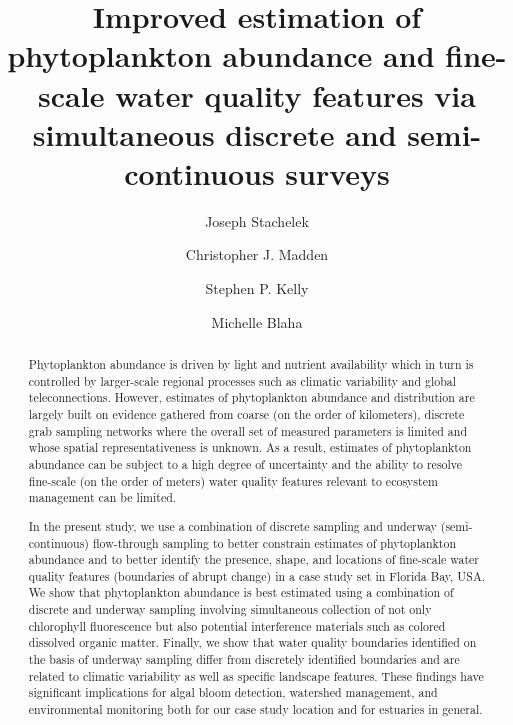 \documentclass[review]{elsarticle}
\begin{document}
  
  \begin{frontmatter}
  
  \title{Improved estimation of phytoplankton abundance and fine-scale water quality features via simultaneous discrete and semi-continuous surveys}

  \author[sfwmd,msu]{Joseph Stachelek}

  \author[sfwmd]{Christopher J. Madden}
  \author[sfwmd]{Stephen P. Kelly}
  \author[sfwmd]{Michelle Blaha}
    
  \address[sfwmd]{South Florida Water Management District \\
                 Everglades Systems Assessment Section \\
                 West Palm Beach, FL 33406, USA \\}
  \address[msu]{Department of Fisheries and Wildlife \\
                Michigan State University, \\
                East Lansing, MI 48824, USA \\}
  
  \begin{abstract}
    Phytoplankton abundance is driven by light and nutrient availability which in turn is controlled by larger-scale regional processes such as climatic variability and global teleconnections. However, estimates of phytoplankton abundance and distribution are largely built on evidence gathered from coarse (on the order of kilometers), discrete grab sampling networks where the overall set of measured parameters is limited and whose spatial representativeness is unknown. As a result, estimates of phytoplankton abundance can be subject to a high degree of uncertainty and the ability to resolve fine-scale (on the order of meters) water quality features relevant to ecosystem management can be limited. 

    In the present study, we use a combination of discrete sampling and underway (semi-continuous) flow-through sampling to better constrain estimates of phytoplankton abundance and to better identify the presence, shape, and locations of fine-scale water quality features (boundaries of abrupt change) in a case study set in Florida Bay, USA. We show that phytoplankton abundance is best estimated using a combination of discrete and underway sampling involving simultaneous collection of not only chlorophyll fluorescence but also potential interference materials such as colored dissolved organic matter. Finally, we show that water quality boundaries identified on the basis of underway sampling differ from discretely identified boundaries and are related to climatic variability as well as specific landscape features. These findings have significant implications for algal bloom detection, watershed management, and environmental monitoring both for our case study location and for estuaries in general.
    

\end{abstract}
\end{frontmatter}
\end{document}

